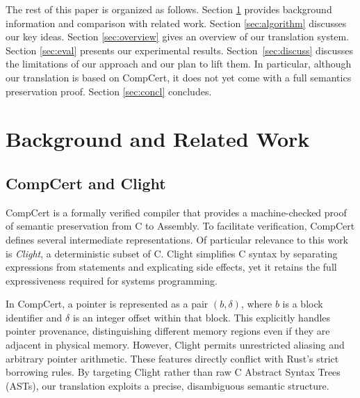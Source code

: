 \documentclass{llncs} %
\begin{document}
The rest of this paper is organized as follows. Section \ref{sec:background} provides background information and comparison with related work. Section \ref{sec:algorithm} discusses our key ideas. Section \ref{sec:overview} gives an overview of our translation system. Section \ref{sec:eval} presents our experimental results. Section~\ref{sec:discuss} discusses the limitations of our approach and our plan to lift them. In particular, although our translation is based on CompCert, it does not yet come with a full semantics preservation proof. Section \ref{sec:concl} concludes.
%


\section{Background and Related Work}
\label{sec:background}


\subsection{CompCert and Clight}
CompCert \cite{Leroy2009} is a formally verified compiler that provides a machine-checked proof of semantic preservation from C to Assembly. To facilitate verification, CompCert defines several intermediate representations. Of particular relevance to this work is \emph{Clight}, a deterministic subset of C. Clight simplifies C syntax by separating expressions from statements and explicating side effects, yet it retains the full expressiveness required for systems programming.

In CompCert, a pointer is represented as a pair $(b, \delta)$, where $b$ is a block identifier and $\delta$ is an integer offset within that block. This explicitly handles pointer provenance, distinguishing different memory regions even if they are adjacent in physical memory. However, Clight permits unrestricted aliasing and arbitrary pointer arithmetic. These features directly conflict with Rust's strict borrowing rules. By targeting Clight rather than raw C Abstract Syntax Trees (ASTs), our translation exploits a precise, disambiguous semantic structure.%
\end{document}
